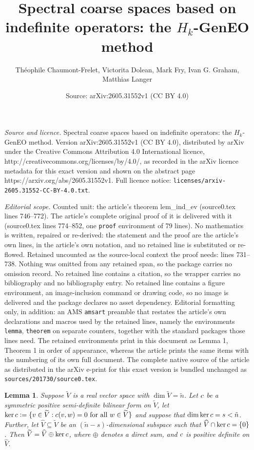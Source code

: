 \documentclass[10pt,a4paper]{amsart}
\title{Spectral coarse spaces based on indefinite operators: the $H_k$-GenEO method}
\author{Th\'eophile Chaumont-Frelet, Victorita Dolean, Mark Fry, Ivan G. Graham, Matthias Langer}
\date{Source: arXiv:2605.31552v1 (CC BY 4.0)}
\newtheorem{lemma}{Lemma}
\newcommand{\assign}{\mathrel{\mathop:}=}
\newcommand{\txtc}{\textup{\texttt{c}}}
\newcommand{\wV}{\widetilde{V}}
\newcommand{\whV}{\widehat{V}}
\begin{document}
\maketitle

\noindent\emph{Source and licence.} Spectral coarse spaces based on indefinite operators: the $H_k$-GenEO method. Version arXiv:2605.31552v1 (CC BY 4.0), distributed by arXiv under the Creative Commons Attribution 4.0 International licence, http://creativecommons.org/licenses/by/4.0/, as recorded in the arXiv licence metadata for this exact version and shown on the abstract page https://arxiv.org/abs/2605.31552v1. Full licence notice: \texttt{licenses/arxiv-2605.31552-CC-BY-4.0.txt}.\par\smallskip

\noindent\textit{Editorial scope.} Counted unit: the article's theorem lem\_ind\_ev (source0.tex lines 746--772). The article's complete original proof of it is delivered with it (source0.tex lines 774--852, one \texttt{proof} environment of 79 lines). No mathematics is written, repaired or re-derived: the statement and the proof are the article's own lines, in the article's own notation, and no retained line is substituted or re-flowed.  Retained uncounted as the source-local context the proof needs: lines 731--738.  Nothing was omitted from any retained span, so the package carries no omission record.  No retained line contains a citation, so the wrapper carries no bibliography and no bibliography entry.  No retained line contains a figure environment, an image-inclusion command or drawing code, so no image is delivered and the package declares no asset dependency.  Editorial formatting only, in addition: an AMS \texttt{amsart} preamble that restates the article's own declarations and macros used by the retained lines, namely the environments \texttt{lemma}, \texttt{theorem} on separate counters, together with the standard packages those lines need.  The retained environments print in this document as Lemma 1, Theorem 1 in order of appearance, whereas the article prints the same items with the numbering of its own full document.  The complete native source of the article as distributed in the arXiv e-print for this exact version is bundled unchanged as \texttt{sources/201730/source0.tex}.
\begin{lemma} \label{cpd}
Suppose $\wV$ is a real vector space with $\dim \wV = \tilde n$.   
Let $\txtc$ be a symmetric positive semi-definite bilinear form on $\wV$, 
let $\ker \txtc \assign \{ v \in \wV: \txtc(v,w) = 0 \ \text{for all} \ w \in \wV\}$ 
and suppose that $\dim \ker \txtc = s < \tilde n$. 
Further, let $\whV\subseteq \wV$ be an $(\tilde n-s)$-dimensional subspace such that $\whV\cap\ker\txtc=\{0\}$.
Then $\wV=\whV\oplus\ker\txtc$, where $\oplus$ denotes a direct sum, and $\txtc$ is positive definite on $\whV$.
\end{lemma}
\end{document}
